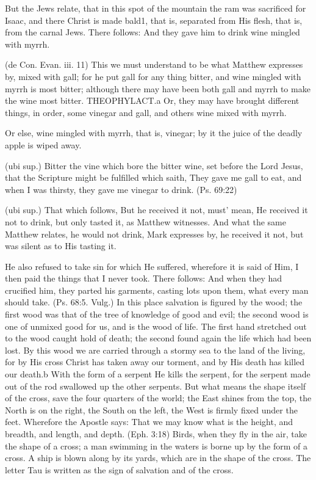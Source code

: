  But the Jews relate, that in this spot of the mountain the ram was sacrificed for Isaac, and there Christ is made bald1, that is, separated from His flesh, that is, from the carnal Jews. There follows: And they gave him to drink wine mingled with myrrh.

 (de Con. Evan. iii. 11) This we must understand to be what Matthew expresses by, mixed with gall; for he put gall for any thing bitter, and wine mingled with myrrh is most bitter; although there may have been both gall and myrrh to make the wine most bitter. THEOPHYLACT.a Or, they may have brought different things, in order, some vinegar and gall, and others wine mixed with myrrh.

 Or else, wine mingled with myrrh, that is, vinegar; by it the juice of the deadly apple is wiped away.

 (ubi sup.) Bitter the vine which bore the bitter wine, set before the Lord Jesus, that the Scripture might be fulfilled which saith, They gave me gall to eat, and when I was thirsty, they gave me vinegar to drink. (Ps. 69:22)

 (ubi sup.) That which follows, But he received it not, must’ mean, He received it not to drink, but only tasted it, as Matthew witnesses. And what the same Matthew relates, he would not drink, Mark expresses by, he received it not, but was silent as to His tasting it.

 He also refused to take sin for which He suffered, wherefore it is said of Him, I then paid the things that I never took. There follows: And when they had crucified him, they parted his garments, casting lots upon them, what every man should take. (Ps. 68:5. Vulg.) In this place salvation is figured by the wood; the first wood was that of the tree of knowledge of good and evil; the second wood is one of unmixed good for us, and is the wood of life. The first hand stretched out to the wood caught hold of death; the second found again the life which had been lost. By this wood we are carried through a stormy sea to the land of the living, for by His cross Christ has taken away our torment, and by His death has killed our death.b With the form of a serpent He kills the serpent, for the serpent made out of the rod swallowed up the other serpents. But what means the shape itself of the cross, save the four quarters of the world; the East shines from the top, the North is on the right, the South on the left, the West is firmly fixed under the feet. Wherefore the Apostle says: That we may know what is the height, and breadth, and length, and depth. (Eph. 3:18) Birds, when they fly in the air, take the shape of a cross; a man swimming in the waters is borne up by the form of a cross. A ship is blown along by its yards, which are in the shape of the cross. The letter Tau is written as the sign of salvation and of the cross.

